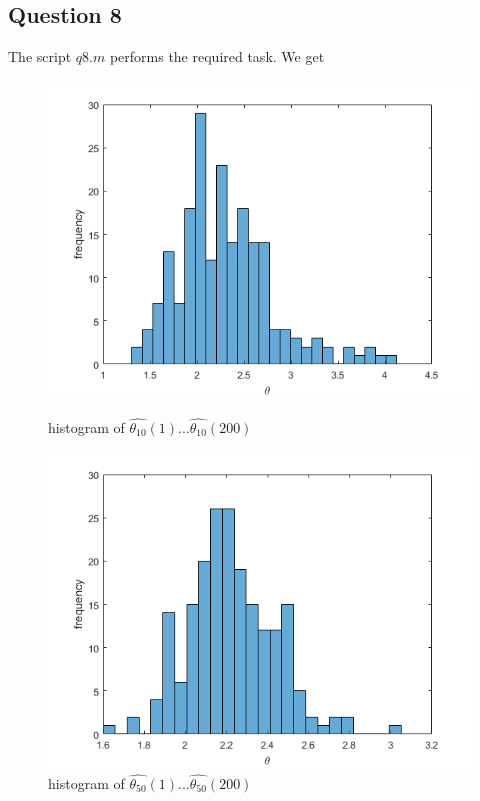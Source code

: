 \documentclass[10pt,a4paper]{report}
\begin{document}
\newpage

\subsection*{Question 8}
The script $q8.m$ performs the required task. We get

\begin{figure}[ht]
\begin{minipage}[b]{0.5\linewidth}
\centering
\includegraphics[width=\textwidth]{q8n10.png}
\caption{histogram of $\hat{\theta_{10}}(1)...\hat{\theta_{10}}(200)$}
\end{minipage}
\hspace{0.5cm}
\begin{minipage}[b]{0.5\linewidth}
\centering
\includegraphics[width=\textwidth]{q8n50.png}
\caption{histogram of $\hat{\theta_{50}}(1)...\hat{\theta_{50}}(200)$}
\end{minipage}
\end{figure}
\end{document}
